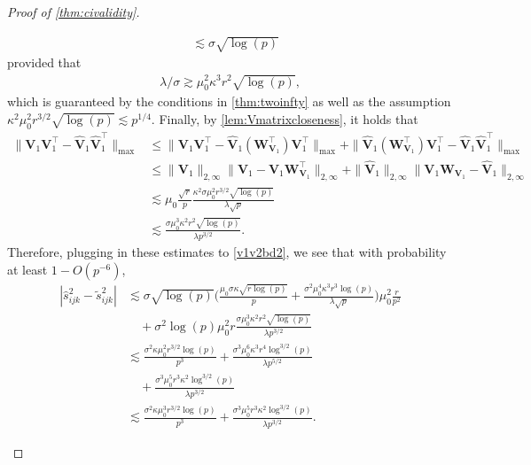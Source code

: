 \documentclass[10pt]{article}
\newcommand{\0}{{\mathbf{0}}}
\newcommand{\1}{{\mathbf{1}}}
\renewcommand{\t}{^{\top}}
\renewcommand{\tilde}{\widetilde}
\renewcommand{\hat}{\widehat}
\renewcommand{\hat}{\widehat}
\begin{document}
\begin{proof}[Proof of \cref{thm:civalidity}]
\begin{itemize}
\begin{align*}
    &\lesssim \sigma\sqrt{\log(p)}
\end{align*}
provided that
\begin{align*}
    \lambda/\sigma \gtrsim \mu_0^2 \kappa^3 r^2 \sqrt{\log(p)},
\end{align*}
which is guaranteed by the conditions in \cref{thm:twoinfty} as well as the assumption $\kappa^2 \mu_0^2 r^{3/2} \sqrt{\log(p)} \lesssim p^{1/4}$.  Finally, by \cref{lem:Vmatrixcloseness}, it holds that
\begin{align*}
    \| \mathbf{V}_1 \mathbf{V}_1\t -\mathbf{\hat V}_1 \mathbf{\hat V}_1\t \|_{\max} &\leq \| \mathbf{V}_1 \mathbf{V}_1\t - \mathbf{\hat V}_1 (\mathbf{W}_{\mathbf{V}_1}\t) \mathbf{V}_1\t \|_{\max} + \| \mathbf{\hat V}_1 (\mathbf{W}_{\mathbf{V}_1}\t) \mathbf{V}_1\t - \mathbf{\hat V}_1 \mathbf{\hat V}_1\t \|_{\max} \\
    &\leq \| \mathbf{V}_1 \|_{2,\infty} \| \mathbf{V}_1 - \mathbf{\hat V}_1 \mathbf{W}_{\mathbf{V}_1}\t \|_{2,\infty} + \| \mathbf{\hat V}_1 \|_{2,\infty} \| \mathbf{V}_1 \mathbf{W}_{\mathbf{V}_1} - \mathbf{\hat V}_1 \|_{2,\infty} \\
    &\lesssim \mu_0 \frac{\sqrt{r}}{p} \frac{\kappa^2 \sigma \mu_0^2 r^{3/2} \sqrt{\log(p)}}{\lambda \sqrt{p}} \\
    &\lesssim \frac{ \sigma \mu_0^3 \kappa^2 r^2 \sqrt{\log(p)}}{\lambda p^{3/2}}.
\end{align*}
Therefore, plugging in these estimates to \eqref{v1v2bd2}, we see that with probability at least $1 - O(p^{-6})$,
\begin{align}
    | \hat s^2_{ijk} - \tilde s_{ijk}^2 | &\lesssim  \sigma \sqrt{\log(p)} \bigg( \frac{\mu_0 \sigma \kappa \sqrt{r\log(p)}}{p} + \frac{\sigma^2 \mu_0^4 \kappa^3 r^3 \log(p)}{\lambda \sqrt{p}} \bigg) \mu_0^2 \frac{r}{p^2} \nonumber \\
    &\quad + \sigma^2 \log(p) \mu_0^2 r \frac{\sigma \mu_0^3 \kappa^2 r^2 \sqrt{\log(p)}}{\lambda p^{3/2}} \nonumber \\
    &\lesssim \frac{\sigma^2 \kappa \mu_0^2 r^{3/2} \log(p)}{p^3} + \frac{\sigma^3 \mu_0^6 \kappa^3 r^4 \log^{3/2}(p)}{\lambda p^{5/2}} \nonumber \\
    &\quad + \frac{\sigma^3 \mu_0^5 r^3 \kappa^2 \log^{3/2}(p)}{\lambda p^{3/2}} \nonumber \\
    &\lesssim \frac{\sigma^2 \kappa \mu_0^3 r^{3/2} \log(p)}{p^3} + \frac{\sigma^3 \mu_0^5 r^3 \kappa^2 \log^{3/2}(p)}{\lambda p^{3/2}}.\label{vhatvtildebound}
\end{align}

\end{itemize}
\end{proof}
\end{document}
